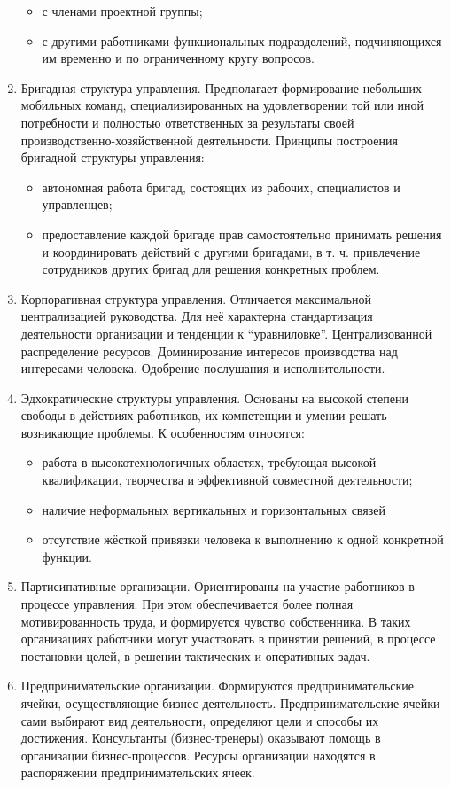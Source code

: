 \documentclass[12pt, russian, oneside, article]{ncc}
\begin{document}
\begin{enumerate}
\begin{itemize}
\item с членами проектной группы;
\item с другими работниками функциональных подразделений, подчиняющихся им временно и по ограниченному кругу вопросов.
\end{itemize}

\item Бригадная структура управления. Предполагает формирование небольших мобильных команд, специализированных на удовлетворении той или иной потребности и полностью ответственных за результаты своей производственно-хозяйственной деятельности. Принципы построения бригадной структуры управления:

\begin{itemize}
\item автономная работа бригад, состоящих из рабочих, специалистов и управленцев;
\item предоставление каждой бригаде прав самостоятельно принимать решения и координировать действий с другими бригадами, в т. ч. привлечение сотрудников других бригад для решения конкретных проблем.
\end{itemize}

\item Корпоративная структура управления. Отличается максимальной централизацией руководства. Для неё характерна стандартизация деятельности организации и тенденции к ``уравниловке''. Централизованной распределение ресурсов. Доминирование интересов производства над интересами человека. Одобрение послушания и исполнительности.
\item Эдхократические структуры управления. Основаны на высокой степени свободы в действиях работников, их компетенции и умении решать возникающие проблемы. К особенностям относятся:

\begin{itemize}
\item работа в высокотехнологичных областях, требующая высокой квалификации, творчества и эффективной совместной деятельности;
\item наличие неформальных вертикальных и горизонтальных связей
\item отсутствие жёсткой привязки человека к выполнению к одной конкретной функции.
\end{itemize}

\item Партисипативные организации. Ориентированы на участие работников в процессе управления. При этом обеспечивается более полная мотивированность труда, и формируется чувство собственника. В таких организациях работники могут участвовать в принятии решений, в процессе постановки целей, в решении тактических и оперативных задач.
\item Предпринимательские организации. Формируются предпринимательские ячейки, осуществляющие бизнес-деятельность. Предпринимательские ячейки сами выбирают вид деятельности, определяют цели и способы их достижения. Консультанты (бизнес-тренеры) оказывают помощь в организации бизнес-процессов. Ресурсы организации находятся в распоряжении предпринимательских ячеек.
\end{enumerate}
\end{document}
